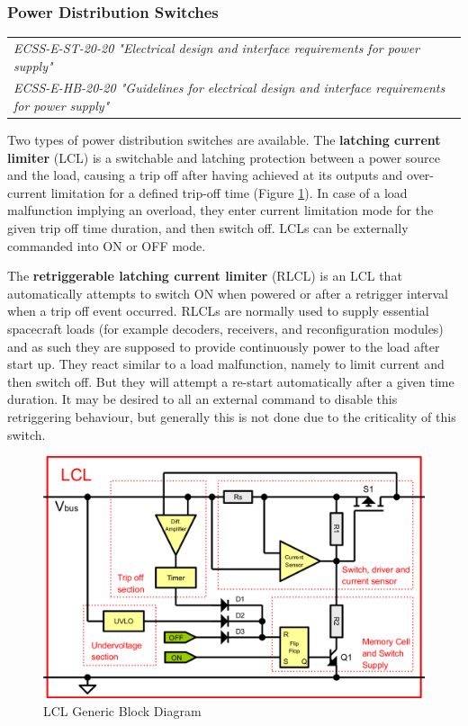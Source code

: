 \subsubsection{Power Distribution Switches}

\begin{tabular}{l}
\textit{ECSS-E-ST-20-20 "Electrical design and interface requirements for power supply" \cite{ECSS-E-ST-20-20}} \\
\textit{ECSS-E-HB-20-20 "Guidelines for electrical design and interface requirements for power supply" \cite{ECSS-E-HB-20-20}} \\
\end{tabular}

Two types of power distribution switches are available. The \textbf{latching current limiter} (LCL) is a switchable and latching protection between a power source and the load, causing a trip off after having achieved at its outputs and over-current limitation for a defined trip-off time (Figure \ref{fig:LCL Generic Block Diagram}). In case of a load malfunction implying an overload, they enter current limitation mode for the given trip off time duration, and then switch off. LCLs can be externally commanded into ON or OFF mode.

The \textbf{retriggerable latching current limiter} (RLCL) is an LCL that automatically attempts to switch ON when powered or after a retrigger interval when a trip off event occurred. RLCLs are normally used to supply essential spacecraft loads (for example decoders, receivers, and reconfiguration modules) and as such they are supposed to provide continuously power to the load after start up. They react similar to a load malfunction, namely to limit current and then switch off. But they will attempt a re-start automatically after a given time duration. It may be desired to all an external command to disable this retriggering behaviour, but generally this is not done due to the criticality of this switch.

\begin{figure}[h]
\centering\includegraphics[scale=0.2]{fig/lcl_generic_block_diagram}
\caption{LCL Generic Block Diagram}
\label{fig:LCL Generic Block Diagram}
\end{figure}

